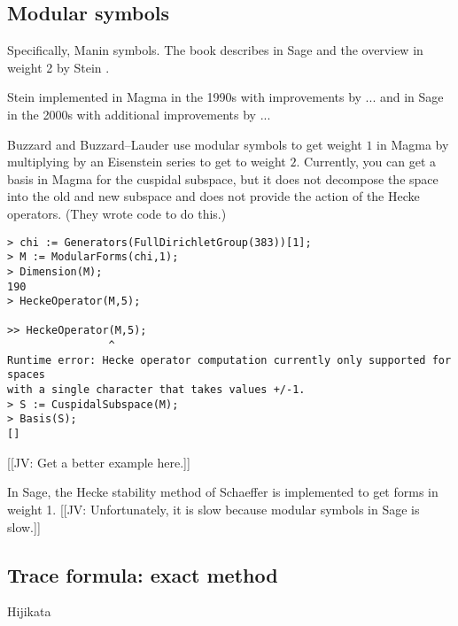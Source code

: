 \documentclass[11pt]{amsart}
\numberwithin{equation}{subsection}
\theoremstyle{plain}
\theoremstyle{definition}
\newcommand{\jv}[1]{{\color{red} \textsf{[[JV: #1]]}}}
\begin{document}
\subsection{Modular symbols}

Specifically, Manin symbols.  The book \cite{Stein} describes in Sage and the overview in weight 2 by Stein \cite{Stein2}.

Stein implemented in Magma in the 1990s with improvements by ...  and in Sage in the 2000s with additional improvements by ...

Buzzard and Buzzard--Lauder use modular symbols to get weight $1$ in Magma by multiplying by an Eisenstein series to get to weight $2$.  Currently, you can get a basis in Magma for the cuspidal subspace, but it does not decompose the space into the old and new subspace and does not provide the action of the Hecke operators.  (They wrote code to do this.)  

\begin{verbatim}
> chi := Generators(FullDirichletGroup(383))[1];
> M := ModularForms(chi,1);
> Dimension(M);
190
> HeckeOperator(M,5);

>> HeckeOperator(M,5);
                ^
Runtime error: Hecke operator computation currently only supported for spaces 
with a single character that takes values +/-1.
> S := CuspidalSubspace(M);
> Basis(S);
[]
\end{verbatim}

\jv{Get a better example here.}

In Sage, the Hecke stability method of Schaeffer \cite{Schaeffer} is implemented to get forms in weight 1.  \jv{Unfortunately, it is slow because modular symbols in Sage is slow.}

\subsection{Trace formula: exact method}

Hijikata
\end{document}
